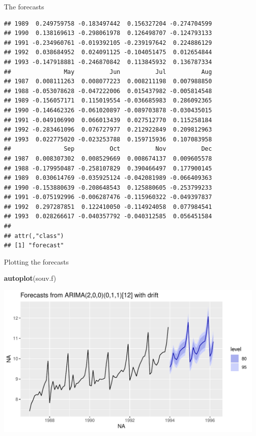 \documentclass[ignorenonframetext,]{beamer}
\newenvironment{Shaded}{\begin{snugshade}}{\end{snugshade}}
\newcommand{\KeywordTok}[1]{\textcolor[rgb]{0.13,0.29,0.53}{\textbf{#1}}}
\newcommand{\NormalTok}[1]{#1}
\begin{document}
\begin{frame}[fragile]{The forecasts}
\begin{verbatim}
## 1989  0.249759758 -0.183497442  0.156327204 -0.274704599
## 1990  0.138169613 -0.298061978  0.126498707 -0.124793133
## 1991 -0.234960761 -0.019392105 -0.239197642  0.224886129
## 1992  0.038684952  0.024091125 -0.104051475  0.012654844
## 1993 -0.147918881 -0.246870842  0.113845932  0.136787334
##               May          Jun          Jul          Aug
## 1987  0.008111263  0.008077223  0.008211198  0.007988850
## 1988 -0.053078628 -0.047222006  0.015437982 -0.005814548
## 1989 -0.156057171  0.115019554 -0.036685983  0.286092365
## 1990 -0.146462326 -0.061020897 -0.089703878 -0.030435015
## 1991 -0.049106990  0.066013439  0.027512770  0.115258184
## 1992 -0.283461096  0.076727977  0.212922849  0.209812963
## 1993  0.022775020 -0.023253788  0.159715936  0.107083958
##               Sep          Oct          Nov          Dec
## 1987  0.008307302  0.008529669  0.008674137  0.009605578
## 1988 -0.179950487 -0.258107829  0.390466497  0.177900145
## 1989  0.030614769 -0.035925124 -0.042081989 -0.066409363
## 1990 -0.153880639 -0.208648543  0.125880605 -0.253799233
## 1991 -0.075192996 -0.006287476 -0.115960322 -0.049397837
## 1992  0.297287851  0.122410050 -0.114924058  0.077984541
## 1993  0.028266617 -0.040357792 -0.040312585  0.056451584
## 
## attr(,"class")
## [1] "forecast"
\end{verbatim}

\normalsize

\end{frame}

\begin{frame}[fragile]{Plotting the forecasts}
\protect\hypertarget{plotting-the-forecasts-1}{}

\begin{Shaded}
\begin{Highlighting}[]
\KeywordTok{autoplot}\NormalTok{(souv.f)}
\end{Highlighting}
\end{Shaded}

\includegraphics{figure/unnamed-chunk-626-1.pdf}

\end{frame}
\end{document}
